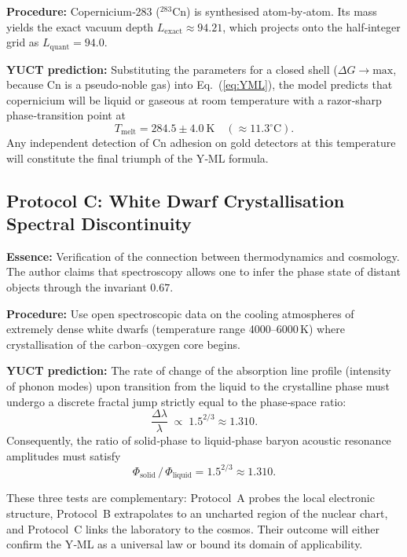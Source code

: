 \documentclass[12pt,a4paper]{article}
\begin{document}
\textbf{Procedure:} Copernicium‑283 (\(^{283}\mathrm{Cn}\)) is synthesised atom‑by‑atom. Its mass yields the exact vacuum depth \(L_{\mathrm{exact}} \approx 94.21\), which projects onto the half‑integer grid as \(L_{\mathrm{quant}} = 94.0\).

\textbf{YUCT prediction:} Substituting the parameters for a closed shell (\(\Delta G \to \mathrm{max}\), because Cn is a pseudo‑noble gas) into Eq.~(\ref{eq:YML}), the model predicts that copernicium will be liquid or gaseous at room temperature with a razor‑sharp phase‑transition point at
\begin{equation}
	T_{\mathrm{melt}} = 284.5 \pm 4.0~\mathrm{K} \quad (\approx 11.3^\circ\mathrm{C}).
\end{equation}
Any independent detection of Cn adhesion on gold detectors at this temperature will constitute the final triumph of the Y‑ML formula.

\subsection{Protocol C: White Dwarf Crystallisation Spectral Discontinuity}
\textbf{Essence:} Verification of the connection between thermodynamics and cosmology. The author claims that spectroscopy allows one to infer the phase state of distant objects through the invariant \(0.67\).

\textbf{Procedure:} Use open spectroscopic data on the cooling atmospheres of extremely dense white dwarfs (temperature range 4000–6000 K) where crystallisation of the carbon–oxygen core begins.

\textbf{YUCT prediction:} The rate of change of the absorption line profile (intensity of phonon modes) upon transition from the liquid to the crystalline phase must undergo a discrete fractal jump strictly equal to the phase‑space ratio:
\begin{equation}
	\frac{\Delta \lambda}{\lambda} \;\propto\; 1.5^{2/3} \approx 1.310 .
\end{equation}
Consequently, the ratio of solid‑phase to liquid‑phase baryon acoustic resonance amplitudes must satisfy
\begin{equation}
	\Phi_{\mathrm{solid}} \,/\, \Phi_{\mathrm{liquid}} = 1.5^{2/3} \approx 1.310 .
\end{equation}

These three tests are complementary: Protocol~A probes the local electronic structure, Protocol~B extrapolates to an uncharted region of the nuclear chart, and Protocol~C links the laboratory to the cosmos. Their outcome will either confirm the Y‑ML as a universal law or bound its domain of applicability.
	
\end{document}
